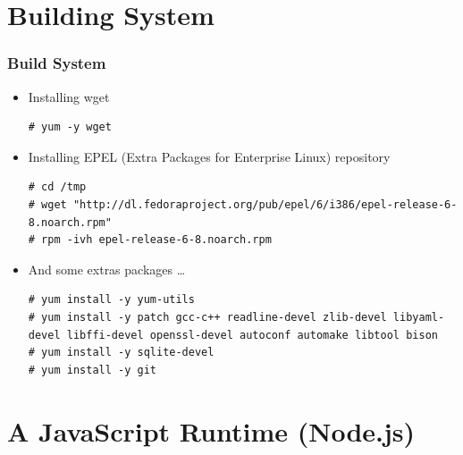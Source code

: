 \documentclass{beamer}
\begin{document}

\section{Building System}
\begin{frame}[fragile]
\frametitle{Build System}
\lstset{language=shell, escapechar=!}
\begin{itemize}
\item Installing wget
\begin{lstlisting}[escapechar=!]
# yum -y wget
\end{lstlisting}

\item Installing EPEL (Extra Packages for Enterprise Linux) repository 
\begin{lstlisting}[escapechar=!]
# cd /tmp
# wget "http://dl.fedoraproject.org/pub/epel/6/i386/epel-release-6-8.noarch.rpm"
# rpm -ivh epel-release-6-8.noarch.rpm
\end{lstlisting}

\item And some extras packages \dots

\begin{lstlisting}[escapechar=!]
# yum install -y yum-utils
# yum install -y patch gcc-c++ readline-devel zlib-devel libyaml-devel libffi-devel openssl-devel autoconf automake libtool bison
# yum install -y sqlite-devel
# yum install -y git
\end{lstlisting}
\end{itemize}
\end{frame}
\section{A JavaScript Runtime (Node.js)}
\end{document}
